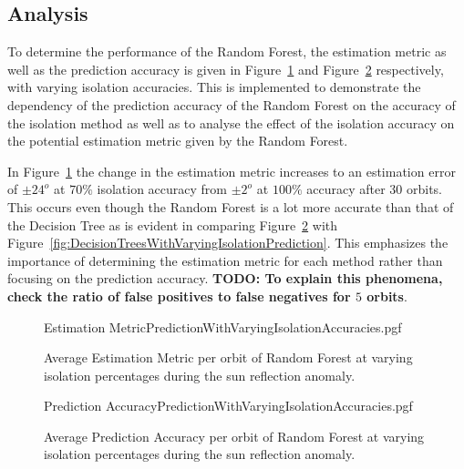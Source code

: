 \subsection{Analysis}
To determine the performance of the Random Forest, the estimation metric as well as the prediction accuracy is given in Figure~\ref{fig:RandomForestWithVaryingIsolationEstimation} and Figure~\ref{fig:RandomForestWithVaryingIsolationPrediction} respectively, with varying isolation accuracies. This is implemented to demonstrate the dependency of the prediction accuracy of the Random Forest on the accuracy of the isolation method as well as to analyse the effect of the isolation accuracy on the potential estimation metric given by the Random Forest.

In Figure~\ref{fig:RandomForestWithVaryingIsolationEstimation} the change in the estimation metric increases to an estimation error of $\pm 24^o$ at $70\%$ isolation accuracy from $\pm 2^o$ at $100\%$ accuracy after $30$ orbits. This occurs even though the Random Forest is a lot more accurate than that of the Decision Tree as is evident in comparing Figure~\ref{fig:RandomForestWithVaryingIsolationPrediction} with Figure~\ref{fig:DecisionTreesWithVaryingIsolationPrediction}. This emphasizes the importance of determining the estimation metric for each method rather than focusing on the prediction accuracy. \textbf{TODO: To explain this phenomena, check the ratio of false positives to false negatives for $5$ orbits}.
\begin{figure}[!htb]
	\centering
	{Estimation MetricPredictionWithVaryingIsolationAccuracies.pgf}
	
	\caption{Average Estimation Metric per orbit of Random Forest at varying isolation percentages  during the sun reflection anomaly.}
	\label{fig:RandomForestWithVaryingIsolationEstimation}
\end{figure}

\begin{figure}[!htb]
	\centering
	{Prediction AccuracyPredictionWithVaryingIsolationAccuracies.pgf}
	
	\caption{Average Prediction Accuracy per orbit of Random Forest at varying isolation percentages  during the sun reflection anomaly.}
	\label{fig:RandomForestWithVaryingIsolationPrediction}
\end{figure}

